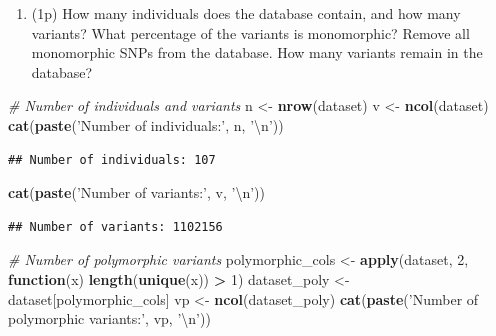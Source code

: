 \documentclass[
]{article}
\newenvironment{Shaded}{\begin{snugshade}}{\end{snugshade}}
\newcommand{\CharTok}[1]{\textcolor[rgb]{0.31,0.60,0.02}{#1}}
\newcommand{\CommentTok}[1]{\textcolor[rgb]{0.56,0.35,0.01}{\textit{#1}}}
\newcommand{\ControlFlowTok}[1]{\textcolor[rgb]{0.13,0.29,0.53}{\textbf{#1}}}
\newcommand{\DecValTok}[1]{\textcolor[rgb]{0.00,0.00,0.81}{#1}}
\newcommand{\KeywordTok}[1]{\textcolor[rgb]{0.13,0.29,0.53}{\textbf{#1}}}
\newcommand{\NormalTok}[1]{#1}
\newcommand{\OperatorTok}[1]{\textcolor[rgb]{0.81,0.36,0.00}{\textbf{#1}}}
\newcommand{\StringTok}[1]{\textcolor[rgb]{0.31,0.60,0.02}{#1}}
\providecommand{\tightlist}{%
  \setlength{\itemsep}{0pt}\setlength{\parskip}{0pt}}
\begin{document}
\begin{enumerate}
\def\labelenumi{\arabic{enumi}.}
\setcounter{enumi}{1}
\tightlist
\item
  (1p) How many individuals does the database contain, and how many
  variants? What percentage of the variants is monomorphic? Remove all
  monomorphic SNPs from the database. How many variants remain in the
  database?
\end{enumerate}

\begin{Shaded}
\begin{Highlighting}[]
\CommentTok{# Number of individuals and variants}
\NormalTok{n <-}\StringTok{ }\KeywordTok{nrow}\NormalTok{(dataset)}
\NormalTok{v <-}\StringTok{ }\KeywordTok{ncol}\NormalTok{(dataset)}
\KeywordTok{cat}\NormalTok{(}\KeywordTok{paste}\NormalTok{(}\StringTok{'Number of individuals:'}\NormalTok{, n, }\StringTok{'}\CharTok{\textbackslash{}n}\StringTok{'}\NormalTok{))}
\end{Highlighting}
\end{Shaded}

\begin{verbatim}
## Number of individuals: 107
\end{verbatim}

\begin{Shaded}
\begin{Highlighting}[]
\KeywordTok{cat}\NormalTok{(}\KeywordTok{paste}\NormalTok{(}\StringTok{'Number of variants:'}\NormalTok{, v, }\StringTok{'}\CharTok{\textbackslash{}n}\StringTok{'}\NormalTok{))}
\end{Highlighting}
\end{Shaded}

\begin{verbatim}
## Number of variants: 1102156
\end{verbatim}

\begin{Shaded}
\begin{Highlighting}[]
\CommentTok{# Number of polymorphic variants}
\NormalTok{polymorphic_cols <-}\StringTok{ }\KeywordTok{apply}\NormalTok{(dataset, }\DecValTok{2}\NormalTok{, }\ControlFlowTok{function}\NormalTok{(x) }\KeywordTok{length}\NormalTok{(}\KeywordTok{unique}\NormalTok{(x)) }\OperatorTok{>}\StringTok{ }\DecValTok{1}\NormalTok{)}
\NormalTok{dataset_poly <-}\StringTok{ }\NormalTok{dataset[polymorphic_cols]}
\NormalTok{vp <-}\StringTok{ }\KeywordTok{ncol}\NormalTok{(dataset_poly)}
\KeywordTok{cat}\NormalTok{(}\KeywordTok{paste}\NormalTok{(}\StringTok{'Number of polymorphic variants:'}\NormalTok{, vp, }\StringTok{'}\CharTok{\textbackslash{}n}\StringTok{'}\NormalTok{))}
\end{Highlighting}
\end{Shaded}
\end{document}
